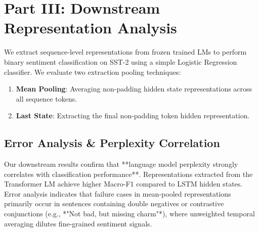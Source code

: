 \documentclass[10pt,twocolumn,3 authorization]{article}
\begin{document}
\section{Part III: Downstream Representation Analysis}
We extract sequence-level representations from frozen trained LMs to perform binary sentiment classification on SST-2 using a simple Logistic Regression classifier. We evaluate two extraction pooling techniques:
\begin{enumerate}
    \item \textbf{Mean Pooling}: Averaging non-padding hidden state representations across all sequence tokens.
    \item \textbf{Last State}: Extracting the final non-padding token hidden representation.
\end{enumerate}

\begin{table}[htbp]
\centering
\caption{Downstream Classification Performance on SST-2.}
\label{tab:part3_results}
\end{table}

\subsection{Error Analysis \& Perplexity Correlation}
Our downstream results confirm that **language model perplexity strongly correlates with classification performance**. Representations extracted from the Transformer LM achieve higher Macro-F1 compared to LSTM hidden states. Error analysis indicates that failure cases in mean-pooled representations primarily occur in sentences containing double negatives or contrastive conjunctions (e.g., *"Not bad, but missing charm"*), where unweighted temporal averaging dilutes fine-grained sentiment signals.
\end{document}
